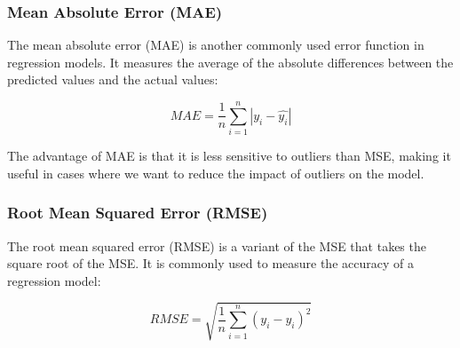 \documentclass{article}
\begin{document}
\subsubsection{Mean Absolute Error (MAE)}
\begin{center}
    \end{center}
The mean absolute error (MAE) is another commonly used error function in regression models. It measures the average of the absolute differences between the predicted values and the actual values:

\begin{equation}
MAE = \frac{1}{n}\sum_{i=1}^{n}|y_i - \hat{y_i}|
\end{equation}

The advantage of MAE is that it is less sensitive to outliers than MSE, making it useful in cases where we want to reduce the impact of outliers on the model.

\subsubsection{Root Mean Squared Error (RMSE)}
\begin{center}
    \end{center}
The root mean squared error (RMSE) is a variant of the MSE that takes the square root of the MSE. It is commonly used to measure the accuracy of a regression model:

\begin{equation}
RMSE = \sqrt{\frac{1}{n}\sum_{i=1}^{n}(y_i - \hat{y_i})^2}
\end{equation}
\end{document}
